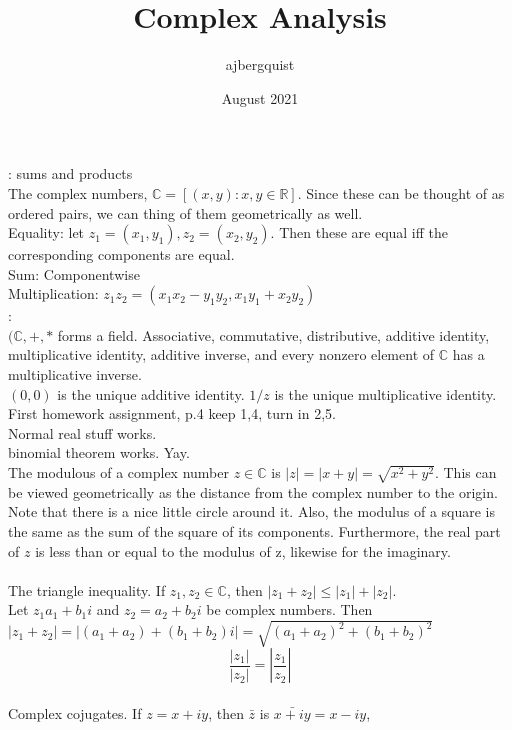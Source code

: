 \documentclass{article}
\title{Complex Analysis}
\author{ajbergquist }
\date{August 2021}
\theoremstyle{definition}
\newcommand{\R}{\mathbb{R}}
\newcommand{\C}{\mathbb{C}}
\begin{document}
: sums and products\\

 The complex numbers, $\C = [(x,y):x,y\in \R]$. Since these can be thought of as ordered pairs, we can thing of them geometrically as well. \\
Equality: let $z_1 = (x_1,y_1),z_2 = (x_2,y_2)$. Then these are equal iff the corresponding components are equal.\\
Sum: Componentwise\\
Multiplication: $z_1z_2 = (x_1x_2 - y_1y_2, x_1y_1 + x_2y_2)$
\\
:\\
 $(\C,+,*$ forms a field. Associative, commutative, distributive, additive identity, multiplicative identity, additive inverse, and every nonzero element of $\C$ has a multiplicative inverse. 
\\

 $(0,0)$ is the unique additive identity. $1/z$ is the unique multiplicative identity. \\

First homework assignment, p.4 keep 1,4, turn in 2,5.\\

 Normal real stuff works.\\
 binomial theorem works. Yay.\\
 The modulous of a complex number $z\in \C$ is $|z| = |x+y| = \sqrt{x^2+y^2}.$ This can be viewed geometrically as the distance from the complex number to the origin. Note that there is a nice little circle around it. Also, the modulus of a square is the same as the sum of the square of its components. Furthermore, the real part of $z$ is less than or equal to the modulus of z, likewise for the imaginary. \\

\\
 The triangle inequality. If $z_1,z_2 \in \C$, then $|z_1+z_2| \le |z_1|+|z_2|$. \\
 Let $z_1 a_1+b_1i$ and $z_2 = a_2+b_2i$ be complex numbers. Then $|z_1+z_2| = |(a_1+a_2)+(b_1+b_2)i| = \sqrt{(a_1+a_2)^2+(b_1+b_2)^2}$\\
$$\frac{|z_1|}{|z_2|} = |\frac{z_1}{z_2}|$$
\\
 Complex cojugates. If $z = x+iy$, then $\bar{z}$ is $\bar{x+iy} = x-iy$,\\
\end{document}
